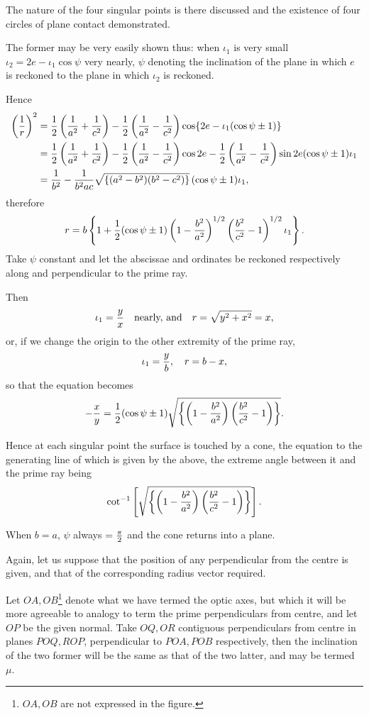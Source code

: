 \documentclass[11pt]{article}
\newcommand{\sourcepage}[1]{\marginpar{\scriptsize p.~#1}}
\begin{document}
The nature of the four singular points is there discussed and the existence of four circles of plane contact demonstrated.

The former may be very easily shown thus: when $\iota_1$ is very small $\iota_2=2e-\iota_1\cos\psi$ very nearly, $\psi$ denoting the inclination of the plane in which $e$ is reckoned to the plane in which $\iota_2$ is reckoned.

Hence
\begin{align*}
 \left({1\over r}\right)^2
 &= {1\over2}\left({1\over a^2}+{1\over c^2}\right)
 -{1\over2}\left({1\over a^2}-{1\over c^2}\right)
 \cos\{2e-\iota_1(\cos\psi\pm1)\}\\
 &= {1\over2}\left({1\over a^2}+{1\over c^2}\right)
 -{1\over2}\left({1\over a^2}-{1\over c^2}\right)\cos 2e
 -{1\over2}\left({1\over a^2}-{1\over c^2}\right)\sin 2e(\cos\psi\pm1)\iota_1\\
 &= {1\over b^2}-{1\over b^2ac}\sqrt{\{(a^2-b^2)(b^2-c^2)\}}\,(\cos\psi\pm1)\iota_1,
\end{align*}
therefore
\[
 r=b\left\{1+{1\over2}(\cos\psi\pm1)\left(1-{b^2\over a^2}\right)^{1/2}
 \left({b^2\over c^2}-1\right)^{1/2}\iota_1\right\}.
\]
Take $\psi$ constant and let the abscissae and ordinates be reckoned respectively along and perpendicular to the prime ray.

Then
\[
 \iota_1={y\over x}\quad\hbox{nearly, and}\quad r=\sqrt{y^2+x^2}=x,
\]
or, if we change the origin to the other extremity of the prime ray,
\[
 \iota_1={y\over b},\quad r=b-x,
\]
so that the equation becomes
\[
 -{x\over y}={1\over2}(\cos\psi\pm1)\sqrt{\left\{\left(1-{b^2\over a^2}\right)\left({b^2\over c^2}-1\right)\right\}}.
\]

\sourcepage{20}
Hence at each singular point the surface is touched by a cone, the equation to the generating line of which is given by the above, the extreme angle between it and the prime ray being
\[
 \cot^{-1}\left[\sqrt{\left\{\left(1-{b^2\over a^2}\right)\left({b^2\over c^2}-1\right)\right\}}\right].
\]

When $b=a$, $\psi$ always $={\pi\over2}$ and the cone returns into a plane.

Again, let us suppose that the position of any perpendicular from the centre is given, and that of the corresponding radius vector required.

Let $OA,OB$\footnote{$OA,OB$ are not expressed in the figure.} denote what we have termed the optic axes, but which it will be more agreeable to analogy to term the prime perpendiculars from centre, and let $OP$ be the given normal. Take $OQ,OR$ contiguous perpendiculars from centre in planes $POQ,ROP$, perpendicular to $POA,POB$ respectively, then the inclination of the two former will be the same as that of the two latter, and may be termed $\mu$.
\end{document}
